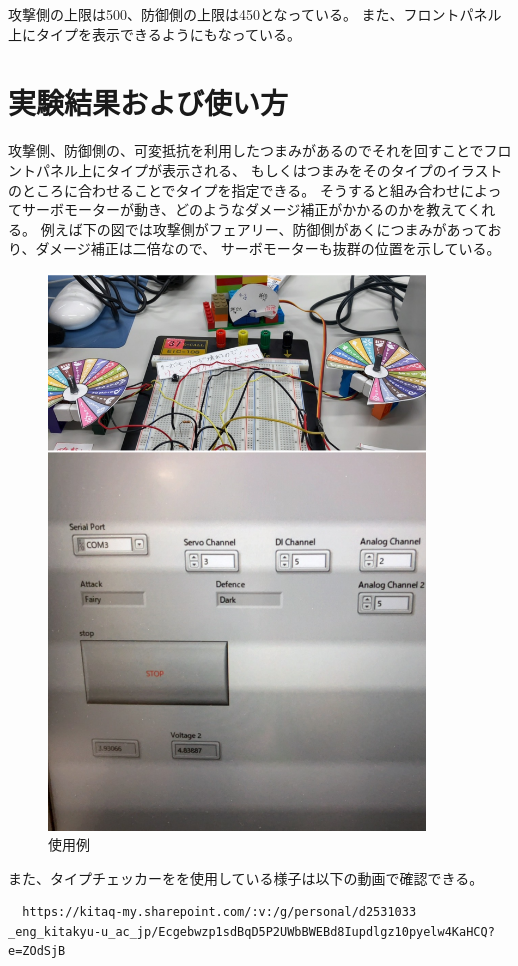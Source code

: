 \documentclass[a4paper,titlepage,11pt]{ltjsarticle}
\begin{document}
攻撃側の上限は500、防御側の上限は450となっている。
また、フロントパネル上にタイプを表示できるようにもなっている。
\section{実験結果および使い方}
攻撃側、防御側の、可変抵抗を利用したつまみがあるのでそれを回すことでフロントパネル上にタイプが表示される、
もしくはつまみをそのタイプのイラストのところに合わせることでタイプを指定できる。
そうすると組み合わせによってサーボモーターが動き、どのようなダメージ補正がかかるのかを教えてくれる。
例えば下の図では攻撃側がフェアリー、防御側があくにつまみがあっており、ダメージ補正は二倍なので、
サーボモーターも抜群の位置を示している。
\begin{figure}[H]
  \begin{center}
    \includegraphics[width=100mm]{howto.pdf}
    \caption{使用例}
  \end{center}
\end{figure}
また、タイプチェッカーをを使用している様子は以下の動画で確認できる。
\begin{verbatim}
  https://kitaq-my.sharepoint.com/:v:/g/personal/d2531033
_eng_kitakyu-u_ac_jp/Ecgebwzp1sdBqD5P2UWbBWEBd8Iupdlgz10pyelw4KaHCQ?e=ZOdSjB
\end{verbatim}
\end{document}
